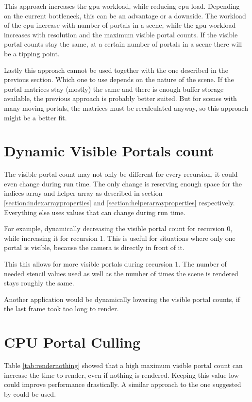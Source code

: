 This approach increases the \gls{gpu} workload, while reducing \gls{cpu} load. Depending on the current bottleneck, this can be an advantage or a downside. The workload of the \gls{cpu} increase with number of portals in a scene, while the \gls{gpu} workload increases with resolution and the maximum visible portal counts. If the visible portal counts stay the same, at a certain number of portals in a scene there will be a tipping point.

Lastly this approach cannot be used together with the one described in the previous section. Which one to use depends on the nature of the scene. If the portal matrices stay (mostly) the same and there is enough buffer storage available, the previous approach is probably better suited. But for scenes with many moving portals, the matrices must be recalculated anyway, so this approach might be a better fit. 








\section{Dynamic Visible Portals count}
The visible portal count may not only be different for every recursion, it could even change during run time. The only change is reserving enough space for the indices array and helper array as described in section \ref{section:indexarrayproperties} and \ref{section:helperarrayproperties} respectively. Everything else uses values that can change during run time.

For example, dynamically decreasing the visible portal count for recursion 0, while increasing it for recursion 1. This is useful for situations where only one portal is visible, because the camera is directly in front of it.

This this allows for more visible portals during recursion 1. The number of needed stencil values used as well as the number of times the scene is rendered stays roughly the same.

Another application would be dynamically lowering the visible portal counts, if the last frame took too long to render.

\section{CPU Portal Culling}
\label{section:cullingportals}
Table \ref{tab:rendernothing} showed that a high maximum visible portal count can increase the time to render, even if nothing is rendered. Keeping this value low could improve performance drastically. A similar approach to the one suggested by \cite{luebke:1995:portals} could be used.

